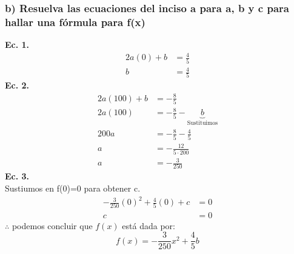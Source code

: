 \documentclass[11pt,letterpaper]{article}
\begin{document}
\subsubsection*{b) Resuelva las ecuaciones del inciso a para a, b y c para hallar una fórmula para f(x)}
\textbf{Ec. 1.} \\
\begin{equation*}
  \begin{split}
    2a(0)+b &= \frac{4}{5} \\
    b &= \frac{4}{5}
  \end{split}
\end{equation*}
\textbf{Ec. 2.} \\
\begin{equation*}
  \begin{split}
    2a(100)+b &= -\frac{8}{5} \\
    2a(100) &= -\frac{8}{5}-\underbrace{b}_{\text{Sustituimos}} \\
    200a &= -\frac{8}{5}-\frac{4}{5} \\
    a &= -\frac{12}{5\cdot200} \\
    a &= -\frac{3}{250}
  \end{split}
\end{equation*}
\textbf{Ec. 3.} \\
Sustiumos en f(0)=0 para obtener c.
\begin{equation*}
  \begin{split}
    -\frac{3}{250}(0)^2+\frac{4}{5}(0)+c &= 0 \\
    c &= 0
  \end{split}
\end{equation*}
$\therefore$ podemos concluir que $f(x)$ está dada por:
\begin{equation*}
  f(x)=-\frac{3}{250}x^2+\frac{4}{5}b
\end{equation*}
\end{document}
